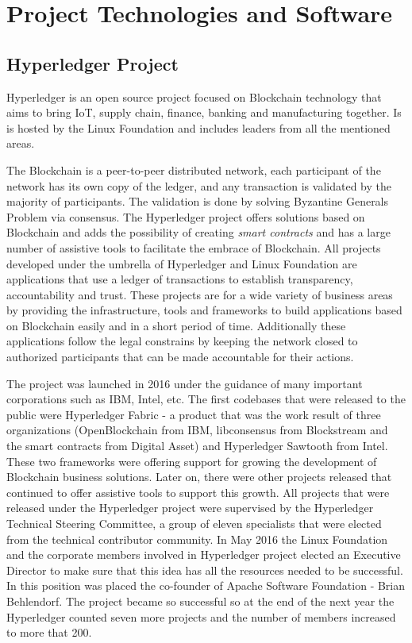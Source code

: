 \chapter{Project Technologies and Software}
\label{chapter:chapter2}

\section{Hyperledger Project}
\label{sub-sec:chapter1-section1}
Hyperledger is an open source project focused on Blockchain technology that aims to bring IoT, supply chain, finance, banking and manufacturing together. Is is hosted by the Linux Foundation and includes leaders from all the mentioned areas.

The Blockchain is a peer-to-peer distributed network, each participant of the network has its own copy of the ledger, and any transaction is validated by the majority of participants. The validation is done by solving Byzantine Generals Problem via consensus.
The Hyperledger project offers solutions based on Blockchain and adds the possibility of creating \emph{smart contracts} and has a large number of assistive tools to facilitate the embrace of Blockchain.
All projects developed under the umbrella of Hyperledger and Linux Foundation are applications that use a ledger of transactions to establish transparency, accountability and trust. These projects are for a wide variety of business areas by providing the infrastructure, tools and frameworks to build applications based on Blockchain easily and in a short period of time. Additionally these applications follow the legal constrains by keeping the network closed to authorized participants that can be made accountable for their actions.

The project was launched in 2016 under the guidance of many important corporations such as IBM, Intel, etc. The first codebases that were released to the public were Hyperledger Fabric - a product that was the work result of three organizations (OpenBlockchain from IBM, libconsensus from Blockstream and the smart contracts from Digital Asset) and Hyperledger Sawtooth from Intel. 
These two frameworks were offering support for growing the development of Blockchain business solutions. Later on, there were other projects released that continued to offer assistive tools to support this growth. All projects that were released under the Hyperledger project were supervised by the Hyperledger Technical Steering Committee, a group of eleven specialists that were elected from the technical contributor community.
In May 2016 the Linux Foundation and the corporate members involved in Hyperledger project elected an Executive Director to make sure that this idea has all the resources needed to be successful. In this position was placed the co-founder of Apache Software Foundation - Brian Behlendorf. 
The project became so successful so at the end of the next year the Hyperledger counted seven more projects and the number of members increased to more that 200.

